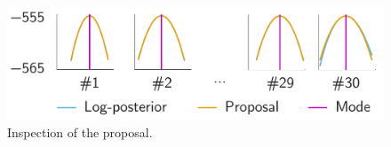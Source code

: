 \begin{figure}
  \centering
  \vspace{-1.5em}
  \includegraphics[width=0.8\linewidth]{include/assets/proposal.pdf}
  \caption{Inspection of the proposal.}
\end{figure}
